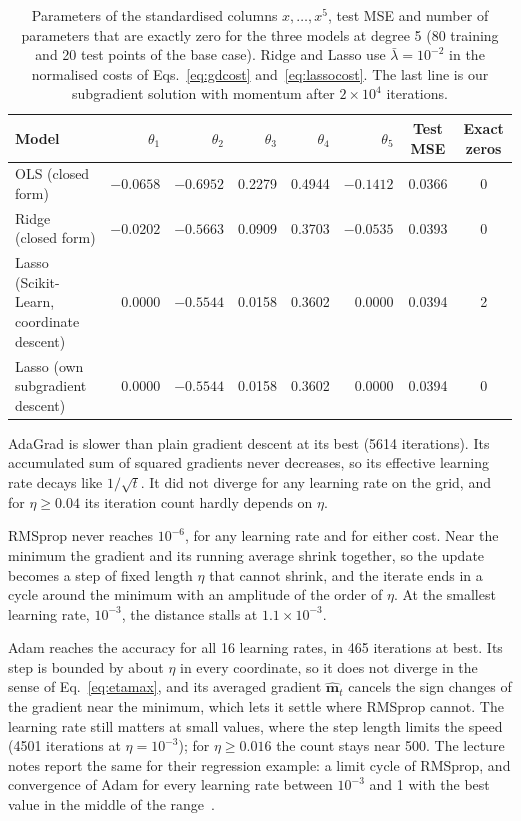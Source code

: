 \documentclass[aps,reprint,amsmath,amssymb,nofootinbib,floatfix]{revtex4-2}
\newcommand{\lb}{\bar\lambda}
\begin{document}
\begin{table}[t]
\caption{Parameters of the standardised columns $x,\dots,x^5$, test MSE and number of parameters
that are exactly zero for the three models at degree 5 (80 training and 20 test points of the base
case). Ridge and Lasso use $\lb=10^{-2}$ in the normalised costs of Eqs.~\eqref{eq:gdcost}
and~\eqref{eq:lassocost}. The last line is our subgradient solution with momentum after
$2\times10^{4}$ iterations.}
\label{tab:lasso}
\begin{ruledtabular}
\begin{tabular}{lrrrrrcc}
Model & $\theta_1$ & $\theta_2$ & $\theta_3$ & $\theta_4$ & $\theta_5$ & Test MSE & Exact zeros \\
\hline
OLS (closed form) & $-0.0658$ & $-0.6952$ & 0.2279 & 0.4944 & $-0.1412$ & 0.0366 & 0 \\
Ridge (closed form) & $-0.0202$ & $-0.5663$ & 0.0909 & 0.3703 & $-0.0535$ & 0.0393 & 0 \\
Lasso (Scikit-Learn, coordinate descent) & 0.0000 & $-0.5544$ & 0.0158 & 0.3602 & 0.0000 & 0.0394 & 2 \\
Lasso (own subgradient descent) & 0.0000 & $-0.5544$ & 0.0158 & 0.3602 & 0.0000 & 0.0394 & 0 \\
\end{tabular}
\end{ruledtabular}
\end{table}

AdaGrad is slower than plain gradient descent at its best (5614 iterations). Its accumulated sum
of squared gradients never decreases, so its effective learning rate decays like $1/\sqrt t$. It
did not diverge for any learning rate on the grid, and for $\eta\ge0.04$ its iteration count
hardly depends on $\eta$.

RMSprop never reaches $10^{-6}$, for any learning rate and for either cost. Near the minimum the
gradient and its running average shrink together, so the update becomes a step of fixed length
$\eta$ that cannot shrink, and the iterate ends in a cycle around the minimum with an amplitude of
the order of $\eta$. At the smallest learning rate, $10^{-3}$, the distance stalls at
$1.1\times10^{-3}$.

Adam reaches the accuracy for all 16 learning rates, in 465 iterations at best. Its step is
bounded by about $\eta$ in every coordinate, so it does not diverge in the sense of
Eq.~\eqref{eq:etamax}, and its averaged gradient $\hat{\bm m}_t$ cancels the sign changes of the
gradient near the minimum, which lets it settle where RMSprop cannot. The learning rate still
matters at small values, where the step length limits the speed (4501 iterations at
$\eta=10^{-3}$); for $\eta\ge0.016$ the count stays near 500. The lecture notes report the same
for their regression example: a limit cycle of RMSprop, and convergence of Adam for every learning
rate between $10^{-3}$ and 1 with the best value in the middle of the
range~\cite{hjorthjensen2026}.
\end{document}
